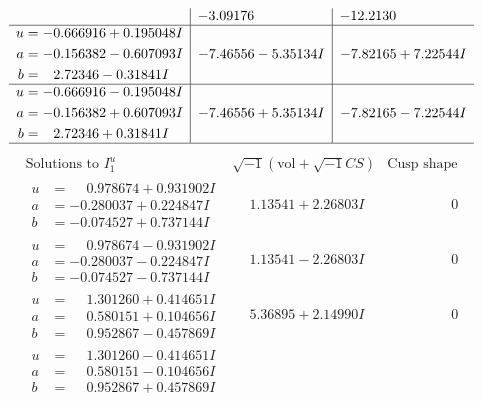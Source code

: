 \documentclass[1p]{elsarticle_modified}
\theoremstyle{definition}
\newcommand{\I}{\sqrt{-1}}
\begin{document}
$$\begin{array}{c|c|c}
 & -3.09176\phantom{ +0.000000I} & -12.2130\phantom{ +0.000000I} \\ \hline\begin{aligned}
u &= -0.666916 + 0.195048 I \\
a &= -0.156382 - 0.607093 I \\
b &= \phantom{-}2.72346 - 0.31841 I\end{aligned}
 & -7.46556 - 5.35134 I & -7.82165 + 7.22544 I \\ \hline\begin{aligned}
u &= -0.666916 - 0.195048 I \\
a &= -0.156382 + 0.607093 I \\
b &= \phantom{-}2.72346 + 0.31841 I\end{aligned}
 & -7.46556 + 5.35134 I & -7.82165 - 7.22544 I\\
 \hline 
 \end{array}$$\newpage$$\begin{array}{c|c|c}  
\text{Solutions to }I^u_{1}& \I (\text{vol} + \sqrt{-1}CS) & \text{Cusp shape}\\
 \hline 
\begin{aligned}
u &= \phantom{-}0.978674 + 0.931902 I \\
a &= -0.280037 + 0.224847 I \\
b &= -0.074527 + 0.737144 I\end{aligned}
 & \phantom{-}1.13541 + 2.26803 I & \phantom{-0.000000 } 0 \\ \hline\begin{aligned}
u &= \phantom{-}0.978674 - 0.931902 I \\
a &= -0.280037 - 0.224847 I \\
b &= -0.074527 - 0.737144 I\end{aligned}
 & \phantom{-}1.13541 - 2.26803 I & \phantom{-0.000000 } 0 \\ \hline\begin{aligned}
u &= \phantom{-}1.301260 + 0.414651 I \\
a &= \phantom{-}0.580151 + 0.104656 I \\
b &= \phantom{-}0.952867 - 0.457869 I\end{aligned}
 & \phantom{-}5.36895 + 2.14990 I & \phantom{-0.000000 } 0 \\ \hline\begin{aligned}
u &= \phantom{-}1.301260 - 0.414651 I \\
a &= \phantom{-}0.580151 - 0.104656 I \\
b &= \phantom{-}0.952867 + 0.457869 I\end{aligned}

\end{array}$$
\end{document}
